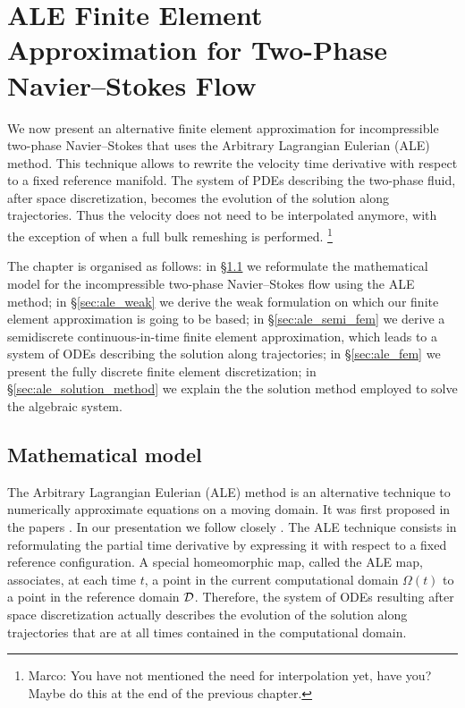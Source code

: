 \chapter[Two-Phase Navier--Stokes Flow ALE FEM]
{\sc ALE Finite Element Approximation for Two-Phase Navier--Stokes Flow}
\label{ch:ale}
We now present an alternative finite element approximation for incompressible
two-phase Navier--Stokes that uses the Arbitrary Lagrangian Eulerian (ALE)
method. This technique allows to
rewrite the velocity time derivative with respect to a fixed reference
manifold. The system of PDEs describing the two-phase fluid,
after space discretization,
becomes the evolution of the solution along trajectories. Thus the velocity
does not need to be interpolated anymore, with the exception of when a full
bulk remeshing is performed.
\footnote{Marco: You have not mentioned the need for interpolation yet, have
you? Maybe do this at the end of the previous chapter.}

The chapter is organised as follows: in \S\ref{sec:ale_model} we reformulate the
mathematical model for the incompressible two-phase Navier--Stokes flow using
the ALE method; in \S\ref{sec:ale_weak} we derive the weak formulation on
which our finite element approximation is going to be based; in
\S\ref{sec:ale_semi_fem} we derive a semidiscrete continuous-in-time finite
element approximation, which leads to a system of ODEs describing the solution
along trajectories; in \S\ref{sec:ale_fem} we present the fully discrete finite
element discretization; in \S\ref{sec:ale_solution_method} we explain the
the solution method employed to solve the algebraic system.

\section{Mathematical model}\label{sec:ale_model}
The Arbitrary Lagrangian Eulerian (ALE) method is an alternative technique to
numerically approximate equations on a moving domain. It was first proposed in
the papers \cite{Donea83,Hughes81}. In our presentation we follow closely
\cite{Nobile99,Formaggia04,NobilePhd}. The ALE technique consists in
reformulating
the partial time derivative by expressing it with respect to a fixed reference
configuration. A special homeomorphic map, called the ALE map, associates, at
each time $t$, a point in the current computational domain $\Omega(t)$ to a
point in the reference domain $\mathcal D$. Therefore, the system of ODEs resulting
after space discretization actually describes the evolution of the solution
along trajectories that are at all times contained in the computational domain.

